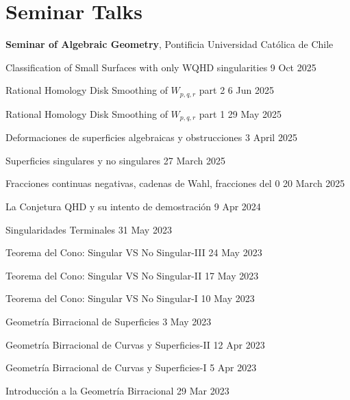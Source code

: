 \section{Seminar Talks} \textbf{Seminar of Algebraic Geometry}, Pontificia Universidad Católica de Chile\\[-0.2cm]
\begin{etaremune}
  \item 
  Classification of Small Surfaces with only WQHD singularities 
  \hfill
  9 Oct 2025
  \item 
  Rational Homology Disk Smoothing of $W_{p,q,r}$ part 2
  \hfill
  6 Jun 2025
  \item
  Rational Homology Disk Smoothing of $W_{p,q,r}$ part 1
  \hfill{}
  29 May 2025
  \item
  Deformaciones de superficies algebraicas y obstrucciones
  \hfill{}
  3 April 2025
  \item
  Superficies singulares y no singulares
  \hfill{}
  27 March 2025
  \item
  Fracciones continuas negativas, cadenas de Wahl, fracciones del 0
  \hfill{}
  20 March 2025
  \item
  La Conjetura QHD y su intento de demostración
  \hfill{}
  9 Apr 2024
  \item
  Singularidades Terminales
  \hfill{}
  31 May 2023
  \item
  Teorema del Cono: Singular VS No Singular-III 
  \hfill{}
  24 May 2023
  \item
  Teorema del Cono: Singular VS No Singular-II
  \hfill{}
  17 May 2023
  \item
  Teorema del Cono: Singular VS No Singular-I
  \hfill{}
  10 May 2023
  \item
  Geometría Birracional de Superficies
  \hfill{}
  3 May 2023
  \item
  Geometría Birracional de Curvas y Superficies-II
  \hfill{}
  12 Apr 2023
  \item
  Geometría Birracional de Curvas y Superficies-I
  \hfill{}
  5 Apr 2023
  \item
  Introducción a la Geometría Birracional
  \hfill{}
  29 Mar 2023
\end{etaremune}



